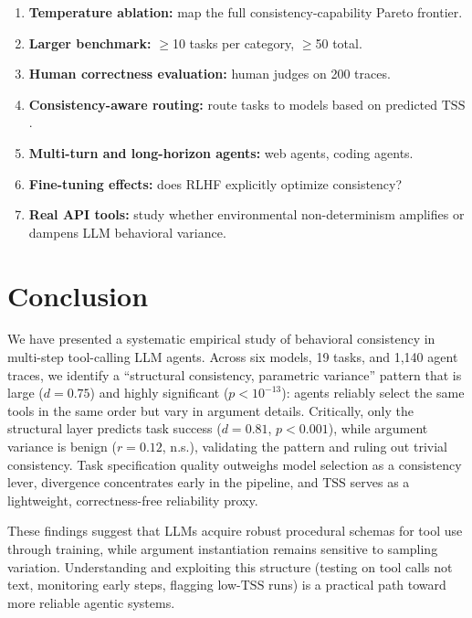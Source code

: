 \documentclass[letterpaper]{article}
\newcommand{\tss}{\mathrm{TSS}}
\begin{document}
\begin{enumerate}[leftmargin=1.5em]
  \item \textbf{Temperature ablation:} map the full consistency-capability
    Pareto frontier.
  \item \textbf{Larger benchmark:} $\geq$10 tasks per category, $\geq$50 total.
  \item \textbf{Human correctness evaluation:} human judges on 200 traces.
  \item \textbf{Consistency-aware routing:} route tasks to models based on
    predicted $\tss$.
  \item \textbf{Multi-turn and long-horizon agents:} web agents, coding agents.
  \item \textbf{Fine-tuning effects:} does RLHF explicitly optimize
    consistency?
  \item \textbf{Real API tools:} study whether environmental non-determinism
    amplifies or dampens LLM behavioral variance.
\end{enumerate}

\section{Conclusion}

We have presented a systematic empirical study of behavioral consistency in
multi-step tool-calling LLM agents. Across six models, 19 tasks, and 1,140 agent
traces, we identify a ``structural consistency, parametric variance'' pattern that
is large ($d = 0.75$) and highly significant ($p < 10^{-13}$): agents reliably
select the same tools in the same order but vary in argument details. Critically,
only the structural layer predicts task success ($d = 0.81$, $p < 0.001$), while
argument variance is benign ($r = 0.12$, n.s.), validating the pattern and
ruling out trivial consistency. Task specification quality outweighs model
selection as a consistency lever, divergence concentrates early in the pipeline,
and $\tss$ serves as a lightweight, correctness-free reliability proxy.

These findings suggest that LLMs acquire robust procedural schemas for tool use
through training, while argument instantiation remains sensitive to sampling
variation. Understanding and exploiting this structure (testing on tool calls not
text, monitoring early steps, flagging low-$\tss$ runs) is a practical path
toward more reliable agentic systems.
\end{document}
